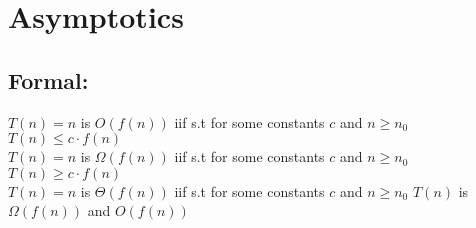 \chapter{Asymptotics}

\section{Formal:}
$T(n) = n$ is $O(f(n))$ iif s.t for some constants $c$ and $n \geq n_0 $ $ T(n) \leq c \cdot f(n)$\\
$T(n) = n$ is $\Omega(f(n))$ iif s.t for some constants $c$ and $n \geq n_0$ $T(n) \geq c \cdot f(n)$\\  
$T(n) = n$ is $\Theta(f(n))$ iif s.t for some constants $c$ and $n \geq n_0$ $T(n)$ is $\Omega(f(n))$ and $O(f(n))$\\